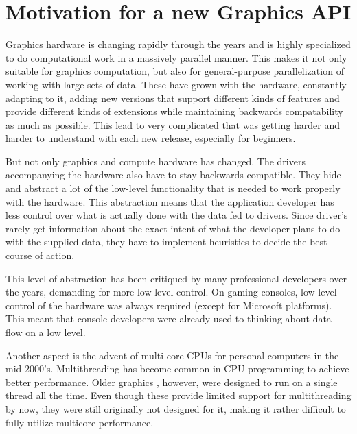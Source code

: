   \section{Motivation for a new Graphics API}

    Graphics hardware is changing rapidly through the years and is highly specialized to do computational work in a massively parallel manner. This makes it not only suitable for graphics computation, but also for general-purpose parallelization of working with large sets of data. These  have grown with the hardware, constantly adapting to it, adding new versions that support different kinds of features and provide different kinds of extensions while maintaining backwards compatability as much as possible. This lead to very complicated  that was getting harder and harder to understand with each new release, especially for beginners.

    But not only graphics and compute hardware has changed. The drivers accompanying the hardware also have to stay backwards compatible. They hide and abstract a lot of the low-level functionality that is needed to work properly with the hardware. This abstraction means that the application developer has less control over what is actually done with the data fed to drivers. Since driver's rarely get information about the exact intent of what the developer plans to do with the supplied data, they have to implement heuristics to decide the best course of action.

    This level of abstraction has been critiqued by many professional developers over the years, demanding for more low-level control. On gaming consoles, low-level control of the hardware was always required (except for Microsoft platforms). This meant that console developers were already used to thinking about data flow on a low level.

    Another aspect is the advent of multi-core CPUs for personal computers in the mid 2000's. Multithreading has become common in CPU programming to achieve better performance. Older graphics , however, were designed to run on a single thread all the time. Even though these  provide limited support for multithreading by now, they were still originally not designed for it, making it rather difficult to fully utilize multicore performance.



